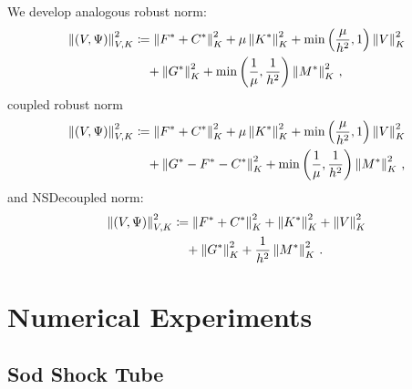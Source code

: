 \documentclass[Dissertation.tex]{subfiles}
\begin{document}
We develop analogous robust norm:
\begin{align*}
\left\| \left( V,\Psi \right) \right\|_{V,K}^2 &\coloneqq
\left\| F^*+C^* \right\|_K^2
+ \mu\left\| K^* \right\|_K^2
+ \min\left( \frac{\mu}{h^2},1 \right)\left\| V \right\|^2_K
\\\nonumber&\quad
+ \left\| G^* \right\|_K^2
+ \min\left( \frac{1}{\mu},\frac{1}{h^2} \right)\left\| M^* \right\|_K^2\,,
\end{align*}
coupled robust norm
\begin{align*}
\left\| \left( V,\Psi \right) \right\|_{V,K}^2 &\coloneqq
\left\| F^*+C^* \right\|_K^2
+ \mu\left\| K^* \right\|_K^2
+ \min\left( \frac{\mu}{h^2},1 \right)\left\| V \right\|^2_K
\\\nonumber&\quad
+ \left\| G^*-F^*-C^* \right\|_K^2
+ \min\left( \frac{1}{\mu},\frac{1}{h^2} \right)\left\| M^* \right\|_K^2\,,
\end{align*}
and NSDecoupled norm:
\begin{align*}
\left\| \left( V,\Psi \right) \right\|_{V,K}^2 &\coloneqq
\left\| F^*+C^* \right\|_K^2
+ \left\| K^* \right\|_K^2
+ \left\| V \right\|^2_K
\\\nonumber&\quad
+ \left\| G^* \right\|_K^2
+ \frac{1}{h^2}\left\| M^* \right\|_K^2\,.
\end{align*}


\section{Numerical Experiments}
\subsection{Sod Shock Tube}
\end{document}
